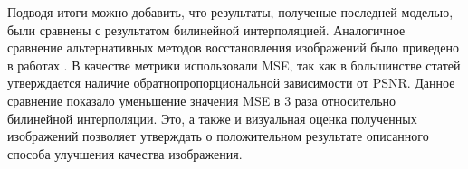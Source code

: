 \documentclass[12pt,twoside]{article}
\begin{document}
	Подводя итоги можно добавить, что результаты, полученые последней моделью, были сравнены с результатом билинейной интерполяцией. Аналогичное сравнение альтернативных методов восстановления изображений было приведено в работах \cite{dong2016image, johnson2016perceptual}. В качестве метрики использовали MSE, так как в большинстве статей \cite{schuler2013machine, burger2012image, johnson2016perceptual} утверждается наличие обратнопропорциональной зависимости от PSNR. Данное сравнение показало уменьшение значения MSE в 3 раза относительно билинейной интерполяции. Это, а также и визуальная оценка полученных изображений позволяет утверждать о положительном результате описанного способа улучшения качества изображения.



\end{document}
